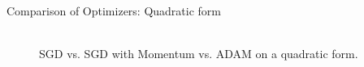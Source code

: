 \documentclass[11pt,compress,t,notes=noshow, xcolor=table]{beamer}
\begin{document}
\begin{vbframe}{Comparison of Optimizers: Quadratic form}

\begin{figure}
     \\
    SGD vs. SGD with Momentum vs. ADAM on a quadratic form. 
\end{figure} 

\end{vbframe}

\endlecture
\end{document}
